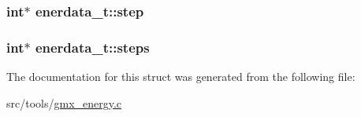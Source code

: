 \hypertarget{structenerdata__t_a80295602c856ebf6ca08e81e54f20bac}{
\subsubsection[{step}]{\setlength{\rightskip}{0pt plus 5cm}int$\ast$ {\bf enerdata\-\_\-t\-::step}}}\label{structenerdata__t_a80295602c856ebf6ca08e81e54f20bac}
\hypertarget{structenerdata__t_a77f55afb5feb54738e9ec8b1f65b58c4}{
\subsubsection[{steps}]{\setlength{\rightskip}{0pt plus 5cm}int$\ast$ {\bf enerdata\-\_\-t\-::steps}}}\label{structenerdata__t_a77f55afb5feb54738e9ec8b1f65b58c4}


\-The documentation for this struct was generated from the following file\-:\begin{DoxyCompactItemize}
\item 
src/tools/\hyperlink{gmx__energy_8c}{gmx\-\_\-energy.\-c}\end{DoxyCompactItemize}
